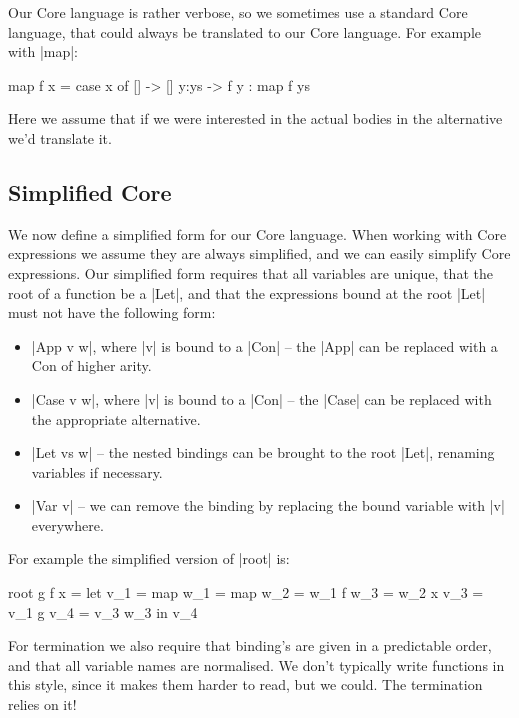 \documentclass[draft]{sigplanconf}
\begin{document}
Our Core language is rather verbose, so we sometimes use a standard Core language, that could always be translated to our Core language. For example with |map|:

\begin{code}
map f x = case x of
    [] -> []
    y:ys -> f y : map f ys
\end{code}

Here we assume that if we were interested in the actual bodies in the alternative we'd translate it.


\subsection{Simplified Core}
\label{sec:simplify}

We now define a simplified form for our Core language. When working with Core expressions we assume they are always simplified, and we can easily simplify Core expressions. Our simplified form requires that all variables are unique, that the root of a function be a |Let|, and that the expressions bound at the root |Let| must not have the following form:

\begin{itemize}
\item |App v w|, where |v| is bound to a |Con| -- the |App| can be replaced with a Con of higher arity.
\item |Case v w|, where |v| is bound to a |Con| -- the |Case| can be replaced with the appropriate alternative.
\item |Let vs w| -- the nested bindings can be brought to the root |Let|, renaming variables if necessary.
\item |Var v| -- we can remove the binding by replacing the bound variable with |v| everywhere.
\end{itemize}


For example the simplified version of |root| is:

\begin{code}
root g f x =  let  v_1 = map
                   w_1 = map
                   w_2 = w_1 f
                   w_3 = w_2 x
                   v_3 = v_1 g
                   v_4 = v_3 w_3
              in   v_4
\end{code}

For termination we also require that binding's are given in a predictable order, and that all variable names are normalised. We don't typically write functions in this style, since it makes them harder to read, but we could. The termination relies on it!
\end{document}
